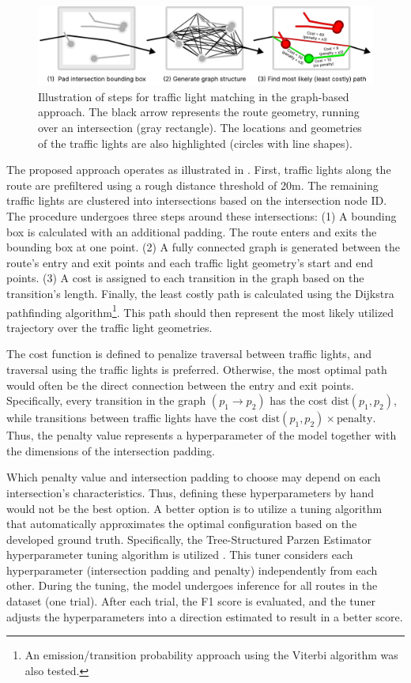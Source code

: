 \begin{figure}[t]
\centering
\includegraphics[width=\linewidth]{images/sg-selection-graph-approach.pdf}
\caption{Illustration of steps for traffic light matching in the graph-based approach. The black arrow represents the route geometry, running over an intersection (gray rectangle). The locations and geometries of the traffic lights are also highlighted (circles with line shapes).}
\label{fig:sg-selection-graph-approach}
\end{figure}

The proposed approach operates as illustrated in . First, traffic lights along the route are prefiltered using a rough distance threshold of 20m. The remaining traffic lights are clustered into intersections based on the intersection node ID. The procedure undergoes three steps around these intersections: (1) A bounding box is calculated with an additional padding. The route enters and exits the bounding box at one point. (2) A fully connected graph is generated between the route's entry and exit points and each traffic light geometry's start and end points. (3) A cost is assigned to each transition in the graph based on the transition's length. Finally, the least costly path is calculated using the Dijkstra pathfinding algorithm\footnote{An emission/transition probability approach using the Viterbi algorithm was also tested.}. This path should then represent the most likely utilized trajectory over the traffic light geometries.

The cost function is defined to penalize traversal between traffic lights, and traversal using the traffic lights is preferred. Otherwise, the most optimal path would often be the direct connection between the entry and exit points. Specifically, every transition in the graph  $(p_{1} \rightarrow p_{2})$ has the cost $\text{dist}(p_{1}, p_{2})$, while transitions between traffic lights have the cost $\text{dist}(p_{1}, p_{2}) \times \text{penalty}$. Thus, the penalty value represents a hyperparameter of the model together with the dimensions of the intersection padding. 

Which penalty value and intersection padding to choose may depend on each intersection's characteristics. Thus, defining these hyperparameters by hand would not be the best option. A better option is to utilize a tuning algorithm that automatically approximates the optimal configuration based on the developed ground truth. Specifically, the Tree-Structured Parzen Estimator hyperparameter tuning algorithm is utilized \cite{ozaki_multiobjective_2020}. This tuner considers each hyperparameter (intersection padding and penalty) independently from each other. During the tuning, the model undergoes inference for all routes in the dataset (one trial). After each trial, the F1 score is evaluated, and the tuner adjusts the hyperparameters into a direction estimated to result in a better score.

